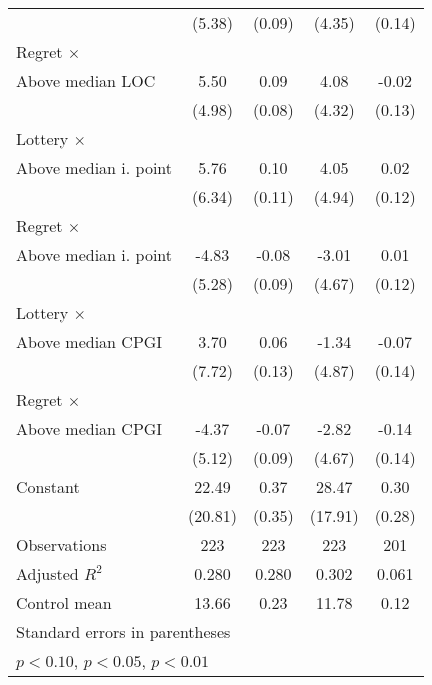 \begin{table}[htbp]
\begin{tabular}{l*{4}{c}}
                &   (5.38)         &   (0.09)         &   (4.35)         &   (0.14)         \\
\addlinespace
Regret $\times$ \\ Above median LOC&     5.50         &     0.09         &     4.08         &    -0.02         \\
                &   (4.98)         &   (0.08)         &   (4.32)         &   (0.13)         \\
\addlinespace
Lottery $\times$ \\ Above median i. point&     5.76         &     0.10         &     4.05         &     0.02         \\
                &   (6.34)         &   (0.11)         &   (4.94)         &   (0.12)         \\
\addlinespace
Regret $\times$ \\ Above median i. point&    -4.83         &    -0.08         &    -3.01         &     0.01         \\
                &   (5.28)         &   (0.09)         &   (4.67)         &   (0.12)         \\
\addlinespace
Lottery $\times$ \\ Above median CPGI&     3.70         &     0.06         &    -1.34         &    -0.07         \\
                &   (7.72)         &   (0.13)         &   (4.87)         &   (0.14)         \\
\addlinespace
Regret $\times$ \\ Above median CPGI&    -4.37         &    -0.07         &    -2.82         &    -0.14         \\
                &   (5.12)         &   (0.09)         &   (4.67)         &   (0.14)         \\
\addlinespace
Constant        &    22.49         &     0.37         &    28.47         &     0.30         \\
                &  (20.81)         &   (0.35)         &  (17.91)         &   (0.28)         \\
\midrule
Observations    &      223         &      223         &      223         &      201         \\
Adjusted \(R^{2}\)&    0.280         &    0.280         &    0.302         &    0.061         \\
Control mean    &    13.66         &     0.23         &    11.78         &     0.12         \\
\bottomrule
\multicolumn{5}{l}{\footnotesize Standard errors in parentheses}\\
\multicolumn{5}{l}{\footnotesize \sym{*} \(p<0.10\), \sym{**} \(p<0.05\), \sym{***} \(p<0.01\)}\\
\end{tabular}
\end{table}

